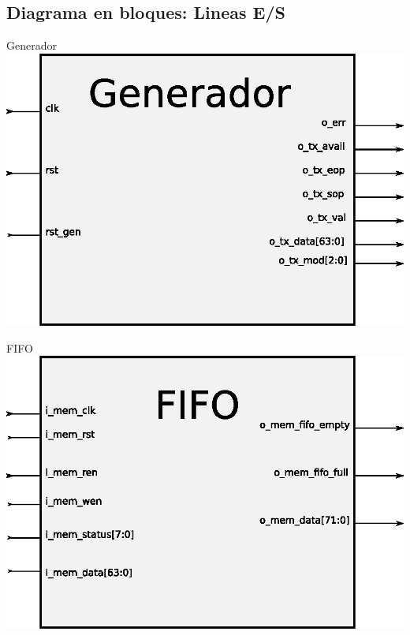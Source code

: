 \documentclass[xcolor=dvipsnames]{beamer}
\begin{document}
\subsection{Diagrama en bloques: Lineas E/S}
\begin{frame}{Generador}
\center 
\includegraphics[scale=0.60]{figures/bloqgenerador.eps}
\end{frame}

\begin{frame}{FIFO}
\center 
\includegraphics[scale=0.60]{figures/bloqfifo.eps}
\end{frame}
\end{document}
